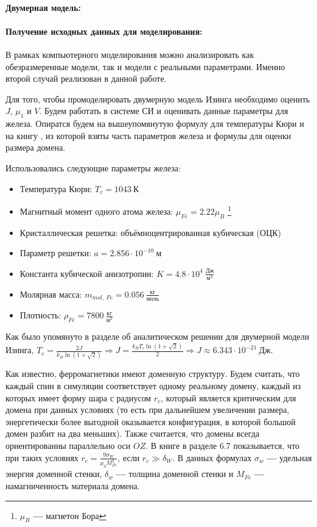 \documentclass[oneside,final,14pt]{extarticle}
\begin{document}
	\paragraph{Двумерная модель:}
	\paragraph{Получение исходных данных для моделирования:}	
	В рамках компьютерного моделирования можно анализировать как обезразмеренные модели, так и модели с реальными параметрами. Именно второй случай реализован в данной работе.
	
	Для того, чтобы промоделировать двумерную модель Изинга необходимо оценить $J$, $\mu_{1}$ и $V$. Будем работать в системе СИ и оценивать данные параметры для железа. Опиратся будем на вышеупомянутую формулу для температуры Кюри и на книгу \cite{magn}, из которой взяты часть параметров железа и формулы для оценки размера домена.
	
	Использовались следующие параметры железа: 
	\begin{itemize}
		\item Температура Кюри: $T_c=1043 \ \text{К}$
		\item Магнитный момент одного атома железа: $\mu_{Fe}=2.22\mu_{B}$ \footnote{$\mu_{B}$ \textbf{---} магнетон Бора}
		\item Кристаллическая решетка: объёмноцентрированная кубическая (ОЦК)
		\item Параметр решетки: $a=2.856 \cdot 10^{-10} \ \text{м}$
		\item Константа кубической анизотропии: $K=4.8 \cdot 10^{4} \ \frac{\text{Дж}}{\text{м}^3}$
		\item Молярная масса: $m_{mol, \ Fe}=0.056 \ \frac{\text{кг}}{\text{моль}}$
		\item Плотность: $\rho_{Fe}=7800 \ \frac{\text{кг}}{\text{м}^3}$
	\end{itemize}
	
	Как было упомянуто в разделе об аналитическом решении для двумерной модели Изинга, $T_{c}=\frac{2J}{k_{B}\ln(1+\sqrt{2})} \Rightarrow J=\frac{k_{B}T_{c}\ln(1+\sqrt{2})}{2} \Rightarrow \boxed{J \approx 6.343 \cdot 10^{-21} \ \text{Дж}}$.
	
	Как известно, ферромагнетики имеют доменную структуру. Будем считать, что каждый спин в симуляции соответствует одному реальному домену, каждый из которых имеет форму шара с радиусом $r_{c}$, который является критическим для домена при данных условиях (то есть при дальнейшем увеличении размера, энергетически более выгодной оказывается конфигурация, в которой большой домен разбит на два меньших). Также считается, что домены всегда ориентированны параллельно оси $OZ$. В книге \cite{magn} в разделе 6.7 показывается, что при таких условиях $r_{c}=\frac{9\sigma_{W}}{\mu_{0}M_{Fe}^2}$, если $r_{c}\gg \delta_{W}$. В данных формулах $\sigma_{w}$ \textbf{---} удельная энергия доменной стенки, $\delta_{w}$ \textbf{---} толщина доменной стенки и $M_{Fe}$ \textbf{---} намагниченность материала домена. 
	
\end{document}
